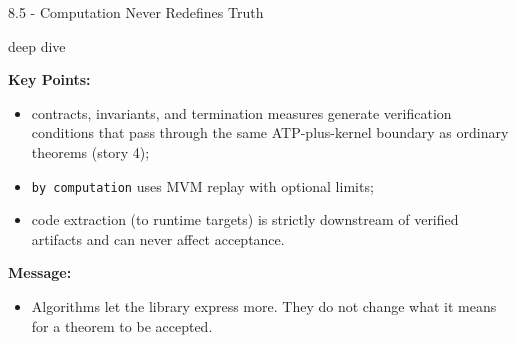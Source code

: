 \documentclass[aspectratio=169,11pt]{beamer}
\newcommand{\deepdivetag}{\hfill\colorbox{black!15}{\textcolor{black!65}{\strut\scriptsize\sffamily deep dive}}}
\begin{document}
\begin{frame}[fragile,t]{8.5 - Computation Never Redefines Truth\deepdivetag}
\smallskip
\textbf{Key Points:}
\begin{itemize}
\setlength{\itemsep}{1pt}
\setlength{\parsep}{0pt}
\setlength{\parskip}{0pt}
\item contracts, invariants, and termination measures generate verification conditions that pass through the same ATP-plus-kernel boundary as ordinary theorems (story 4);
\item \texttt{by computation} uses MVM replay with optional limits;
\item code extraction (to runtime targets) is strictly downstream of verified artifacts and can never affect acceptance.
\end{itemize}
\smallskip
\textbf{Message:}
\begin{itemize}
\setlength{\itemsep}{1pt}
\setlength{\parsep}{0pt}
\setlength{\parskip}{0pt}
\item Algorithms let the library express more. They do not change what it means for a theorem to be accepted.
\end{itemize}
\end{frame}
\end{document}
